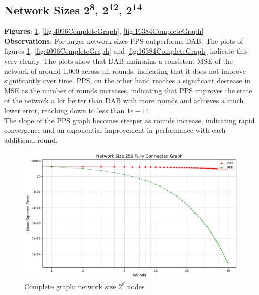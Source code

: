 \subsection{Network Sizes 2\textsuperscript{8}, 2\textsuperscript{12}, 2\textsuperscript{14}}
\textbf{Figures}: \ref{fig:256CompleteGraph}, \ref{fig:4096CompleteGraph}, \ref{fig:16384CompleteGraph}\\
\textbf{Observations}: For larger network sizes PPS outperforms DAB. The plots of figures \ref{fig:256CompleteGraph}, \ref{fig:4096CompleteGraph} and \ref{fig:16384CompleteGraph} indicate this very clearly. The plots show that DAB maintains a consistent MSE of the network of around 1.000 across all rounds, indicating that it does not improve significantly over time. PPS, on the other hand reaches a significant decrease in MSE as the number of rounds increases, indicating that PPS improves the state of the network a lot better than DAB with more rounds and achieves a much lower error, reaching down to less than $1e-14$.\\
The slope of the PPS graph becomes steeper as rounds increase, indicating rapid convergence and an exponential improvement in performance with each additional round.\\
\begin{figure}[H]
    \centering
    \includegraphics[scale=0.5]{figures/completeGraphSimulations/DAB_vs_PPS_FCG_r50_n256.png}
    \caption{Complete graph: network size $2^{8}$ nodes}
    \label{fig:256CompleteGraph}
\end{figure}

